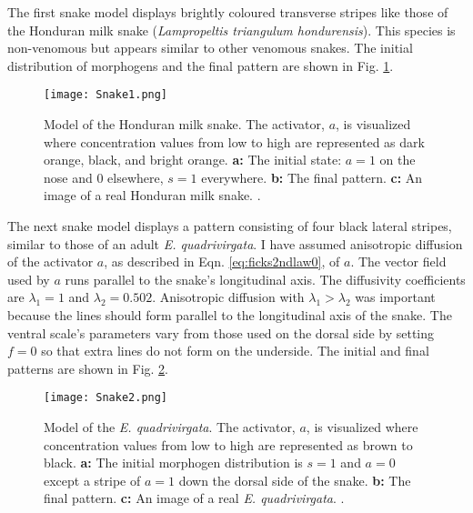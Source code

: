 \newpage
The first snake model displays brightly coloured transverse stripes like those of the Honduran milk snake (\textit{Lampropeltis triangulum hondurensis}). This species is non-venomous but appears similar to other venomous snakes. The initial distribution of morphogens and the final pattern are shown in Fig. \ref{fig:Snake1}.

\begin{figure}[ht]
	\centering
	\texttt{[image: Snake1.png]}
	\caption[Model of the Honduran milk snake]{Model of the Honduran milk snake. The activator, $a$, is visualized where concentration values from low to high are represented as dark orange, black, and bright orange. \textbf{a:} The initial state: $a=1$ on the nose and $0$ elsewhere, $s=1$ everywhere. \textbf{b:} The final pattern. \textbf{c:} An image of a real Honduran milk snake. \textit{}.}
	\label{fig:Snake1}
\end{figure}

The next snake model displays a pattern consisting of four black lateral stripes, similar to those of an adult \textit{E. quadrivirgata}. I have assumed anisotropic diffusion of the activator $a$, as described in Eqn. \ref{eq:ficks2ndlaw0}, of $a$. The vector field used by $a$ runs parallel to the snake's longitudinal axis. The diffusivity coefficients are $\lambda_{1}=1$ and $\lambda_{2}=0.502$. Anisotropic diffusion with $\lambda_{1} > \lambda_{2}$ was important because the lines should form parallel to the longitudinal axis of the snake. The ventral scale's parameters vary from those used on the dorsal side by setting $f=0$ so that extra lines do not form on the underside. The initial and final patterns are shown in Fig. \ref{fig:Snake2}.

\begin{figure}[ht]
	\centering
	\texttt{[image: Snake2.png]}
	\caption[Model of the \textit{E. quadrivirgata}]{Model of the \textit{E. quadrivirgata}. The activator, $a$, is visualized where concentration values from low to high are represented as brown to black. \textbf{a:} The initial morphogen distribution is $s=1$ and $a=0$ except a stripe of $a=1$ down the dorsal side of the snake. \textbf{b:} The final pattern. \textbf{c:} An image of a real \textit{E. quadrivirgata}. \textit{}.}
	\label{fig:Snake2}
\end{figure}

